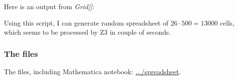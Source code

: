

Here is an output from \textit{Grid[]}:



Using this script, I can generate random spreadsheet of $26 \cdot 500=13000$ cells,
which seems to be processed by Z3 in couple of seconds.

\subsubsection{The files}

The files, including Mathematica notebook: \url{.../spreadsheet}.

